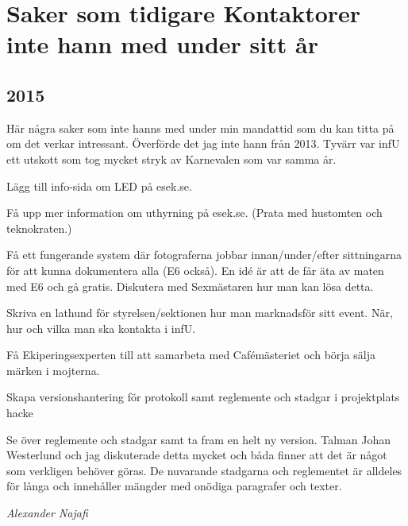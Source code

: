 \documentclass[10pt]{article}
\begin{document}
\section{Saker som tidigare Kontaktorer inte hann med under sitt år}

\subsection{2015}
Här några saker som inte hanns med under min mandattid som du kan titta på om det verkar intressant. Överförde det jag inte hann från 2013. Tyvärr var infU ett utskott som tog mycket stryk av Karnevalen som var samma år.
\begin{tightdashlist}
    \item Lägg till info-sida om LED på esek.se.
    \item Få upp mer information om uthyrning på esek.se. (Prata med hustomten och teknokraten.)
    \item Få ett fungerande system där fotograferna jobbar innan/under/efter sittningarna för att kunna dokumentera alla (E6 också). En idé är att de får äta av maten med E6 och gå gratis. Diskutera med Sexmästaren hur man kan lösa detta.
    \item Skriva en lathund för styrelsen/sektionen hur man marknadsför sitt event. När, hur och vilka man ska kontakta i infU.
    \item Få Ekiperingsexperten till att samarbeta med Cafémästeriet och börja sälja märken i mojterna.
    \item Skapa versionshantering för protokoll samt reglemente och stadgar i projektplats hacke
    \item Se över reglemente och stadgar samt ta fram en helt ny version. Talman Johan Westerlund och jag diskuterade detta mycket och båda finner att det är något som verkligen behöver göras. De nuvarande stadgarna och reglementet är alldeles för långa och innehåller mängder med onödiga paragrafer och texter.
\end{tightdashlist}

\emph{Alexander Najafi}

\newpage
\end{document}

